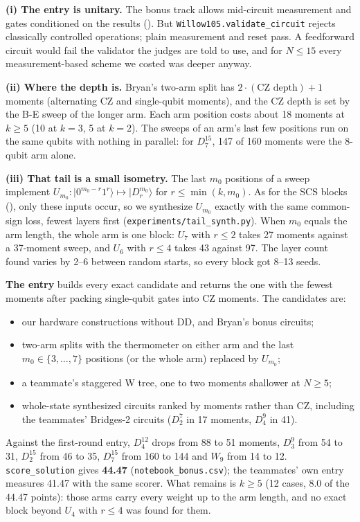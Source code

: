 \documentclass[11pt]{scrartcl}
\newcommand{\ket}[1]{\lvert #1\rangle}
\newcommand{\D}[2]{D^{#1}_{#2}}
\newcommand{\CZ}{\ensuremath{\mathrm{CZ}}}
\newcommand{\file}[1]{\texttt{\small #1}}
\begin{document}
\textbf{(i) The entry is unitary.} The bonus track allows mid-circuit measurement and gates
conditioned on the results (). But \texttt{Willow105.validate\_circuit} rejects
classically controlled operations; plain measurement and reset pass. A feedforward circuit would
fail the validator the judges are told to use, and for $N\le15$ every measurement-based scheme we
costed was deeper anyway.

\textbf{(ii) Where the depth is.} Bryan's two-arm split has $2\cdot(\text{CZ depth})+1$ moments
(alternating \CZ{} and single-qubit moments), and the \CZ{} depth is set by the B-E sweep of the
longer arm. Each arm position costs about 18 moments at $k\ge5$ (10 at $k=3$, 5 at $k=2$). The sweeps
of an arm's last few positions run on the same qubits with nothing in parallel: for $\D{15}7$, 147
of 160 moments were the 8-qubit arm alone.

\textbf{(iii) That tail is a small isometry.} The last $m_0$ positions of a sweep implement
$U_{m_0}\colon\ket{0^{m_0-r}1^r}\mapsto\ket{\D{m_0}r}$ for $r\le\min(k,m_0)$. As for the SCS blocks
(), only these inputs occur, so we synthesize $U_{m_0}$ exactly with the same
common-sign loss, fewest layers first (\file{experiments/tail\_synth.py}). When $m_0$ equals the arm
length, the whole arm is one block: $U_7$ with $r\le2$ takes 27 moments against a 37-moment sweep,
and $U_6$ with $r\le4$ takes 43 against 97. The layer count found varies by 2--6 between random
starts, so every block got 8--13 seeds.

\textbf{The entry} builds every exact candidate and returns the one with the fewest moments after
packing single-qubit gates into \CZ{} moments. The candidates are:
\begin{itemize}
  \item our hardware constructions without DD, and Bryan's bonus circuits;
  \item two-arm splits with the thermometer on either arm and the last $m_0\in\{3,\dots,7\}$
        positions (or the whole arm) replaced by $U_{m_0}$;
  \item a teammate's staggered W tree, one to two moments shallower at $N\ge5$;
  \item whole-state synthesized circuits ranked by moments rather than \CZ{}, including the
        teammates' Bridges-2 circuits ($\D72$ in 17 moments, $\D94$ in 41).
\end{itemize}
Against the first-round entry, $\D{12}4$ drops from 88 to 51 moments, $\D93$ from 54 to 31,
$\D{15}2$ from 46 to 35, $\D{15}7$ from 160 to 144 and $W_9$ from 14 to 12. \file{score\_solution}
gives \textbf{44.47} (\file{notebook\_bonus.csv}); the teammates' own entry measures 41.47 with the
same scorer. What remains is $k\ge5$ (12 cases, 8.0 of the 44.47 points): those arms carry every weight up to the
arm length, and no exact block beyond $U_4$ with $r\le4$ was found for them.
\end{document}

